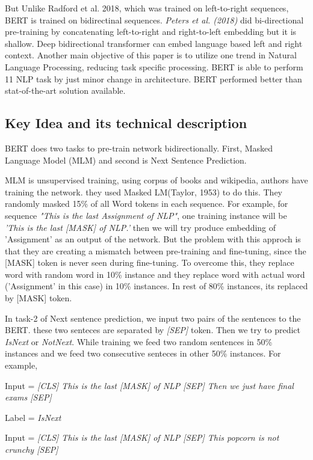 \documentclass[11pt,a4paper]{article}
\begin{document}
But Unlike Radford et al. 2018, which was trained on left-to-right sequences, BERT is trained on bidirectinal sequences. \textit{Peters et al. (2018)} did bi-directional pre-training by concatenating left-to-right and right-to-left embedding but it is shallow. Deep bidirectional transformer can embed language based left and right context. Another main objective of this paper is to utilize one trend in Natural Language Processing, reducing task specific processing. BERT is able to perform 11 NLP task by just minor change in architecture. BERT performed better than stat-of-the-art solution available. 


\subsection{Key Idea and its technical description}
BERT does two tasks to pre-train network bidirectionally. First, Masked Language Model (MLM) and second is Next Sentence Prediction.

MLM is unsupervised training, using corpus of books and wikipedia, authors have training the network. they used Masked LM(Taylor, 1953) to do this. They randomly masked 15\% of all Word tokens in each sequence. For example, for sequence \textit{"This is the last Assignment of NLP"}, one training instance will be \textit{'This is the last [MASK] of NLP.'} then we will try produce embedding of 'Assignment' as an output of the network. But the problem with this approch is that they are creating a mismatch between pre-training and fine-tuning, since the [MASK] token is never seen during fine-tuning. To overcome this, they replace word with random word in 10\% instance and they replace word with actual word ('Assignment' in this case) in 10\% instances. In rest of 80\% instances, its replaced by [MASK] token.

In task-2 of Next sentence prediction, we input two pairs of the sentences to the BERT. these two senteces are separated by \textit{[SEP]} token. Then we try to predict \textit{IsNext} or \textit{NotNext}. While training we feed two random sentences in 50\% instances and we feed two consecutive senteces in other 50\% instances. For example,

Input = \textit{\small [CLS] This is the last [MASK] of NLP [SEP] Then we just have final exams [SEP]}

Label = \textit{\small IsNext}

Input = \textit{\small [CLS] This is the last [MASK] of NLP [SEP] This popcorn is not crunchy [SEP]}
\end{document}
